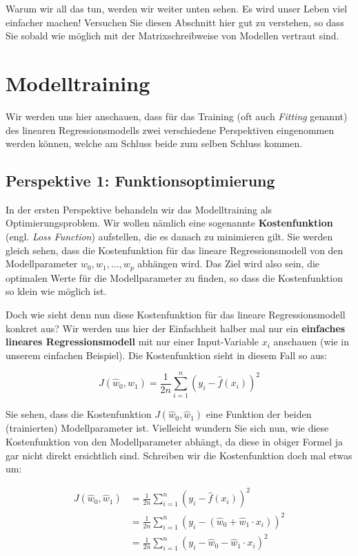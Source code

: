 \documentclass[
]{book}
\begin{document}
Warum wir all das tun, werden wir weiter unten sehen. Es wird unser Leben viel einfacher machen! Versuchen Sie diesen Abschnitt hier gut zu verstehen, so dass Sie sobald wie möglich mit der Matrixschreibweise von Modellen vertraut sind.

\hypertarget{modelltraining}{%
\section{Modelltraining}\label{modelltraining}}

Wir werden uns hier anschauen, dass für das Training (oft auch \emph{Fitting} genannt) des linearen Regressionsmodells zwei verschiedene Perspektiven eingenommen werden können, welche am Schluss beide zum selben Schluss kommen.

\hypertarget{perspektive-1-funktionsoptimierung}{%
\subsection{Perspektive 1: Funktionsoptimierung}\label{perspektive-1-funktionsoptimierung}}

In der ersten Perspektive behandeln wir das Modelltraining als Optimierungsproblem. Wir wollen nämlich eine sogenannte \textbf{Kostenfunktion} (engl. \emph{Loss Function}) aufstellen, die es danach zu minimieren gilt. Sie werden gleich sehen, dass die Kostenfunktion für das lineare Regressionsmodell von den Modellparameter \(w_0,w_1,\dots,w_p\) abhängen wird. Das Ziel wird also sein, die optimalen Werte für die Modellparameter zu finden, so dass die Kostenfunktion so klein wie möglich ist.

Doch wie sieht denn nun diese Kostenfunktion für das lineare Regressionsmodell konkret aus? Wir werden uns hier der Einfachheit halber mal nur ein \textbf{einfaches lineares Regressionsmodell} mit nur einer Input-Variable \(x_i\) anschauen (wie in unserem einfachen Beispiel). Die Kostenfunktion sieht in diesem Fall so aus:

\[
J(\hat{w}_0,\hat{w}_1) = \frac{1}{2n} \sum_{i=1}^{n} \left(y_i - \hat{f}(x_i) \right)^2
\]

Sie sehen, dass die Kostenfunktion \(J(\hat{w}_0,\hat{w}_1)\) eine Funktion der beiden (trainierten) Modellparameter ist. Vielleicht wundern Sie sich nun, wie diese Kostenfunktion von den Modellparameter abhängt, da diese in obiger Formel ja gar nicht direkt ersichtlich sind. Schreiben wir die Kostenfunktion doch mal etwas um:

\begin{align}
J(\hat{w}_0, \hat{w}_1) &= \frac{1}{2n} \sum_{i=1}^{n} \left(y_i - \hat{f}(x_i) \right)^2 \\
&= \frac{1}{2n} \sum_{i=1}^{n} \left(y_i - (\hat{w}_0 + \hat{w}_1 \cdot x_i) \right)^2 \\
&= \frac{1}{2n} \sum_{i=1}^{n} \left(y_i - \hat{w}_0 - \hat{w}_1 \cdot x_i \right)^2 \\
\end{align}
\end{document}
